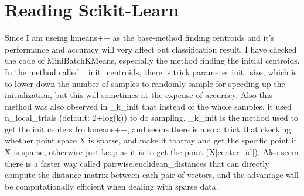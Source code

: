 \documentclass[final]{siamltexmm}
\begin{document}
\section{Reading Scikit-Learn}
Since I am useing kmeans++ as the base-method finding centroids and it's performance and accuracy will very affect out classification result, I have checked the code of MiniBatchKMeans, especially the method finding the initial centroids. In the method called \_init\_centroids, there is trick parameter init\_size, which is to lower down the number of samples to randomly sample for speeding up the initialization, but this will sometimes at the expense of accuracy. Also this method was also observed in \_k\_init that instead of the whole samples, it used n\_local\_trials (default: 2+log(k)) to do sampling. \_k\_init is the method used to get the init centers fro kmeans++, and seems there is also a trick that ckecking whether point space X is sparse, and make it toarray and get the specific point if X is sparse, otherwise just keep as it is to get the point (X[center\_id]). Also seem there is a faster way called pairwise.euclidean\_distances that can directly compute the distance matrix between each pair of vectors, and the advantage will be computationally efficient when dealing with sparse data.
\end{document}
